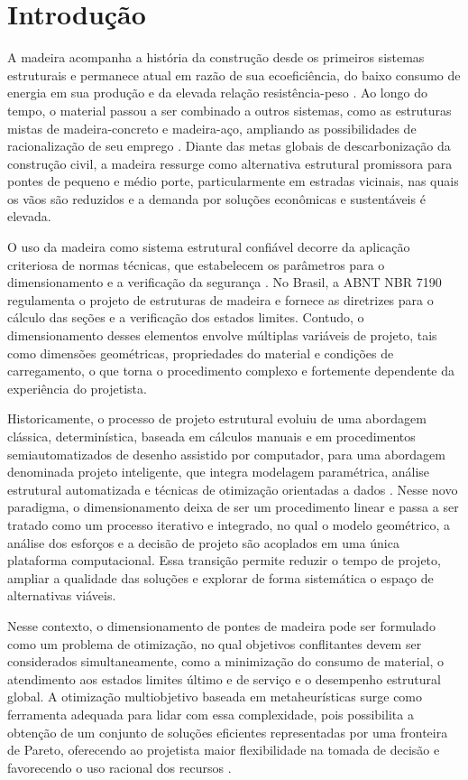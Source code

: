 \section{Introdução}\label{sec:introducao}

A madeira acompanha a história da construção desde os primeiros sistemas estruturais e permanece atual em razão de sua ecoeficiência, do baixo consumo de energia em sua produção e da elevada relação resistência-peso \parencite{NEVES2025, FRAGA2025}. Ao longo do tempo, o material passou a ser combinado a outros sistemas, como as estruturas mistas de madeira-concreto e madeira-aço, ampliando as possibilidades de racionalização de seu emprego \parencite{MIOTTO2009}. Diante das metas globais de descarbonização da construção civil, a madeira ressurge como alternativa estrutural promissora para pontes de pequeno e médio porte, particularmente em estradas vicinais, nas quais os vãos são reduzidos e a demanda por soluções econômicas e sustentáveis é elevada.

O uso da madeira como sistema estrutural confiável decorre da aplicação criteriosa de normas técnicas, que estabelecem os parâmetros para o dimensionamento e a verificação da segurança \parencite{ADOLFS2011}. No Brasil, a ABNT NBR 7190 \parencite{NBR7190-1:2022} regulamenta o projeto de estruturas de madeira e fornece as diretrizes para o cálculo das seções e a verificação dos estados limites. Contudo, o dimensionamento desses elementos envolve múltiplas variáveis de projeto, tais como dimensões geométricas, propriedades do material e condições de carregamento, o que torna o procedimento complexo e fortemente dependente da experiência do projetista.

Historicamente, o processo de projeto estrutural evoluiu de uma abordagem clássica, determinística, baseada em cálculos manuais e em procedimentos semiautomatizados de desenho assistido por computador, para uma abordagem denominada projeto inteligente, que integra modelagem paramétrica, análise estrutural automatizada e técnicas de otimização orientadas a dados \parencite{DEB2009}. Nesse novo paradigma, o dimensionamento deixa de ser um procedimento linear e passa a ser tratado como um processo iterativo e integrado, no qual o modelo geométrico, a análise dos esforços e a decisão de projeto são acoplados em uma única plataforma computacional. Essa transição permite reduzir o tempo de projeto, ampliar a qualidade das soluções e explorar de forma sistemática o espaço de alternativas viáveis.

Nesse contexto, o dimensionamento de pontes de madeira pode ser formulado como um problema de otimização, no qual objetivos conflitantes devem ser considerados simultaneamente, como a minimização do consumo de material, o atendimento aos estados limites último e de serviço e o desempenho estrutural global. A otimização multiobjetivo baseada em metaheurísticas surge como ferramenta adequada para lidar com essa complexidade, pois possibilita a obtenção de um conjunto de soluções eficientes representadas por uma fronteira de Pareto, oferecendo ao projetista maior flexibilidade na tomada de decisão e favorecendo o uso racional dos recursos \parencite{blank2020}.


